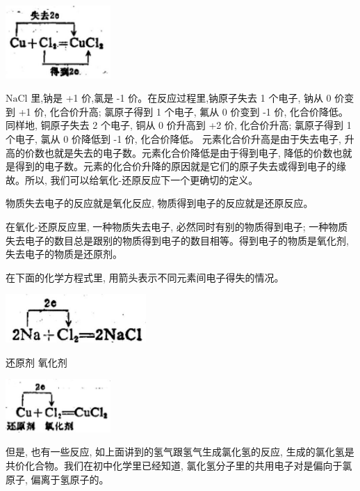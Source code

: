 \documentclass[10pt]{article}
\begin{document}
\begin{center}
\includegraphics[max width=0.3\textwidth]{images/01912d0f-097c-7e75-8f32-4f326cd86c9f_43_517260.jpg}
\end{center}

\(\mathrm{{NaCl}}\) 里,钠是 +1 价,氯是 -1 价。在反应过程里,钠原子失去 1 个电子, 钠从 0 价变到 +1 价, 化合价升高; 氯原子得到 1 个电子, 氟从 0 价变到 -1 价, 化合价降低。同样地, 铜原子失去 2 个电子, 铜从 0 价升高到 +2 价, 化合价升高; 氯原子得到 1 个电子, 氯从 0 价降低到 -1 价, 化合价降低。 元素化合价升高是由于失去电子, 升高的价数也就是失去的电子数。元素化合价降低是由于得到电子, 降低的价数也就是得到的电子数。元素的化合价升降的原因就是它们的原子失去或得到电子的缘故。所以, 我们可以给氧化-还原反应下一个更确切的定义。

物质失去电子的反应就是氧化反应, 物质得到电子的反应就是还原反应。

在氧化-还原反应里, 一种物质失去电子, 必然同时有别的物质得到电子; 一种物质失去电子的数目总是跟别的物质得到电子的数目相等。得到电子的物质是氧化剂, 失去电子的物质是还原剂。

在下面的化学方程式里, 用箭头表示不同元素间电子得失的情况。

\begin{center}
\includegraphics[max width=0.4\textwidth]{images/01912d0f-097c-7e75-8f32-4f326cd86c9f_44_117063.jpg}
\end{center}

还原剂 氧化剂

\begin{center}
\includegraphics[max width=0.3\textwidth]{images/01912d0f-097c-7e75-8f32-4f326cd86c9f_44_999338.jpg}
\end{center}

但是, 也有一些反应, 如上面讲到的氢气跟氢气生成氯化氢的反应, 生成的氯化氢是共价化合物。我们在初中化学里已经知道, 氯化氢分子里的共用电子对是偏向于氯原子, 偏离于氢原子的。
\end{document}

